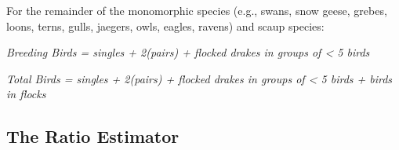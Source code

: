 \documentclass[
]{article}
\begin{document}
For the remainder of the monomorphic species (e.g., swans, snow geese, grebes, loons, terns, gulls, jaegers, owls, eagles, ravens) and scaup species:\newline

\begin{center}

\textit{Breeding Birds = singles + 2(pairs) + flocked drakes in groups of < 5 birds} \newline

\textit{Total Birds = singles + 2(pairs) + flocked drakes in groups of < 5 birds + birds in flocks} \newline

\end{center}

\subsection*{The Ratio Estimator}\label{the-ratio-estimator}
\end{document}
